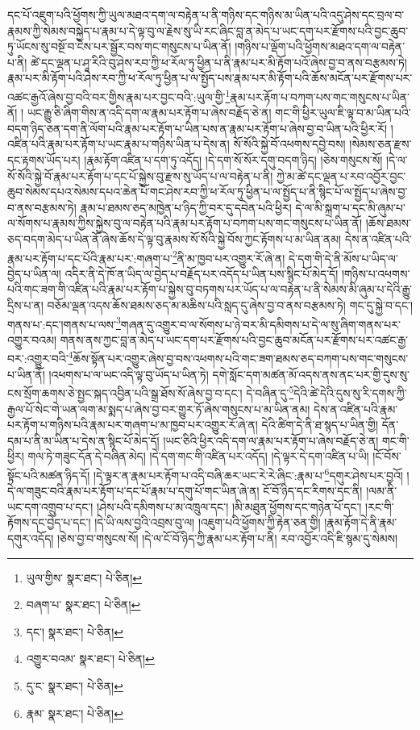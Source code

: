 དང་པོ་འཇུག་པའི་ཕྱོགས་ཀྱི་ཡུལ་མཐའ་དག་ལ་བརྟེན་པ་ནི་གཉིས་དང་གཉིས་མ་ཡིན་པའི་འདུ་ཤེས་དང་བྲལ་བ་རྣམས་ཀྱི་སེམས་བསྐྱེད་པ་རྣམ་པ་དེ་ལྟ་བུ་ལ་རྗེས་སུ་ཡི་རང་ཞིང་བླ་ན་མེད་པ་ཡང་དག་པར་རྫོགས་པའི་བྱང་ཆུབ་ཏུ་ཡོངས་སུ་བསྔོ་བ་ངེས་པར་སྦྱོར་བས་གང་གསུངས་པ་ཡིན་ནོ། །གཉིས་པ་ལྡོག་པའི་ཕྱོགས་མཐའ་དག་ལ་བརྟེན་པ་ནི། ཚེ་དང་ལྡན་པ་ཤཱ་རིའི་བུ་ཤེས་རབ་ཀྱི་ཕ་རོལ་ཏུ་ཕྱིན་པ་ནི་རྣམ་པར་མི་རྟོག་པའོ་ཞེས་བྱ་བ་ནས་བརྩམས་ཏེ། རྣམ་པར་མི་རྟོག་པའི་ཤེས་རབ་ཀྱི་ཕ་རོལ་ཏུ་ཕྱིན་པ་ལ་སྤྱོད་པས་རྣམ་པར་མི་རྟོག་པའི་ཆོས་མངོན་པར་རྫོགས་པར་འཚང་རྒྱའོ་ཞེས་བྱ་བའི་བར་གྱིས་རྣམ་པར་བྱང་བའི་:ཡུལ་གྱི་\footnote{ཡུལ་གྱིས་  སྣར་ཐང་།  པེ་ཅིན། }རྣམ་པར་རྟོག་པ་བཀག་པས་གང་གསུངས་པ་ཡིན་ནོ། །
ཡང་རྒྱུ་ཅི་ཞིག་གིས་ན་འདི་དག་ལ་རྣམ་པར་རྟོག་པ་ཞེས་བརྗོད་ཅེ་ན། གང་གི་ཕྱིར་ཡུལ་ཇི་ལྟ་བ་མ་ཡིན་པའི་བདག་ཉིད་ཅན་དག་ནི་ལོག་པའི་རྣམ་པར་རྟོག་པ་ཡིན་པས་ན་རྣམ་པར་རྟོག་པ་ཞེས་བྱ་བ་ཡིན་པའི་ཕྱིར་རོ། །འཛིན་པའི་རྣམ་པར་རྟོག་པ་ཡང་རྣམ་པ་གཉིས་ཡིན་པ་དེས་ན། སོ་སོའི་སྐྱེ་བོ་འཕགས་དབྱེ་བས། །སེམས་ཅན་རྫས་དང་རྟགས་ཡོད་པར། །རྣམ་རྟོག་འཛིན་པ་དག་ཏུ་འདོད། །དེ་དག་སོ་སོར་དགུ་བདག་ཉིད། །ཅེས་གསུངས་སོ། །དེ་ལ་སོ་སོའི་སྐྱེ་བོ་རྣམ་པར་རྟོག་པ་དང་པོ་སྐྱེས་བུ་རྫས་སུ་ཡོད་པ་ལ་བརྟེན་པ་ནི། ཀྱེ་མ་ཚེ་དང་ལྡན་པ་རབ་འབྱོར་བྱང་ཆུབ་སེམས་དཔའ་སེམས་དཔའ་ཆེན་པོ་གང་ཤེས་རབ་ཀྱི་ཕ་རོལ་ཏུ་ཕྱིན་པ་ལ་སྤྱོད་པ་ནི་སྙིང་པོ་ལ་སྤྱོད་པ་ཞེས་བྱ་བ་ནས་བརྩམས་ཏེ། རྣམ་པ་ཐམས་ཅད་མཁྱེན་པ་ཉིད་ཀྱི་བར་དུ་དབེན་པའི་ཕྱིར། དེ་ལ་མི་སྐྲག་པ་དང་མི་ཞུམ་པ་ལ་སོགས་པ་རྣམས་ཀྱིས་སྐྱེས་བུ་ལ་བརྟེན་པའི་རྣམ་པར་རྟོག་པ་བཀག་པས་གང་གསུངས་པ་ཡིན་ནོ། །ཆོས་ཐམས་ཅད་བདག་མེད་པ་ཡིན་ནོ་ཞེས་ཆོས་དེ་ལྟ་བུ་རྣམས་སོ་སོའི་སྐྱེ་བོས་ཀྱང་རྟོགས་པ་མ་ཡིན་ནམ། དེས་ན་འཛིན་པའི་རྣམ་པར་རྟོག་པ་དང་པོའི་རྣམ་པར་:གཞག་པ་\footnote{བཞག་པ་  སྣར་ཐང་།  པེ་ཅིན། }ནི་མ་ཁྱབ་པར་འགྱུར་རོ་ཞེ་ན། དེ་དག་གི་དེ་ནི་མོས་པ་ཡིད་ལ་བྱེད་པ་ཡིན་ལ། འདིར་ནི་དེ་ཁོ་ན་ཡིད་ལ་བྱེད་པ་བརྗོད་པར་འདོད་པ་ཡིན་པས་སྙིང་པོ་མེད་དོ། །གཉིས་པ་འཕགས་པའི་གང་ཟག་གི་འཛིན་པའི་རྣམ་པར་རྟོག་པ་སྐྱེས་བུ་བཏགས་པར་ཡོད་པ་ལ་བརྟེན་པ་ནི་སེམས་མི་ཞུམ་པ་དེའི་རྒྱུ་དྲིས་པ་ན། བཅོམ་ལྡན་འདས་ཆོས་ཐམས་ཅད་མ་མཆིས་པའི་སླད་དུ་ཞེས་བྱ་བ་ནས་བརྩམས་ཏེ། གང་དུ་སྐྱེ་བ་དང་། གནས་པ་:དང་།གནས་པ་ལས་\footnote{དང་།  སྣར་ཐང་།  པེ་ཅིན། }གཞན་དུ་འགྱུར་བ་ལ་སོགས་པ་ཉེ་བར་མི་དམིགས་པ་དེ་ལ་སུ་ཞིག་གནས་པར་འགྱུར་བའམ། གནས་ནས་ཀྱང་བླ་ན་མེད་པ་ཡང་དག་པར་རྫོགས་པའི་བྱང་ཆུབ་མངོན་པར་རྫོགས་པར་འཚང་རྒྱ་བར་:འགྱུར་བའི་\footnote{འགྱུར་བའམ་  སྣར་ཐང་།  པེ་ཅིན། }ཆོས་སྟོན་པར་འགྱུར་ཞེས་བྱ་བས་འཕགས་པའི་གང་ཟག་ཐམས་ཅད་བཀག་པས་གང་གསུངས་པ་ཡིན་ནོ། །འཕགས་པ་ལ་ཡང་འདི་ལྟ་བུ་ཡོད་པ་ཡིན་ཏེ། དགེ་སློང་དག་མཚན་མོ་འདས་ནས་ནང་པར་གྱི་དུས་སུ་ངས་སྲོག་ཆགས་ཅེ་སྤྱང་སྐད་འབྱིན་པའི་སྒྲ་ཐོས་སོ་ཞེས་བྱ་བ་དང་། དེ་བཞིན་དུ་\footnote{དུ་ང་  སྣར་ཐང་།  པེ་ཅིན། }དེའི་ཚེ་དེའི་དུས་སུ་རི་དགས་ཀྱི་རྒྱལ་པོ་སེང་གེ་ཡན་ལག་མ་སྨད་པ་ཞེས་བྱ་བར་གྱུར་ཏོ་ཞེས་གསུངས་པ་མ་ཡིན་ནམ། དེས་ན་འཛིན་པའི་རྣམ་པར་རྟོག་པ་གཉིས་པའི་རྣམ་པར་གཞག་པ་མ་ཁྱབ་པར་འགྱུར་རོ་ཞེ་ན། དེའི་ཚིག་དེ་ནི་ཐ་སྙད་པ་ཡིན་གྱི། དོན་དམ་པ་ནི་མ་ཡིན་པ་དེས་ན་སྙིང་པོ་མེད་དོ། །ཡང་ཅིའི་ཕྱིར་འདི་དག་ལ་རྣམ་པར་རྟོག་པ་ཞེས་བརྗོད་ཅེ་ན། གང་གི་ཕྱིར། གལ་ཏེ་གཟུང་དོན་དེ་བཞིན་མེད། །དེ་དག་གང་གི་འཛིན་པར་འདོད། །དེ་ལྟར་དེ་དག་འཛིན་པ་ཡི། །ངོ་བོས་སྟོང་པའི་མཚན་ཉིད་དོ། །དེ་ལྟར་ན་རྣམ་པར་རྟོག་པ་འདི་བཞི་ཆར་ཡང་རེ་རེ་ཞིང་:རྣམ་པ་\footnote{རྣམ་  སྣར་ཐང་།  པེ་ཅིན། }དགུར་ཤེས་པར་བྱའོ། །དེ་ལ་གཟུང་བའི་རྣམ་པར་རྟོག་པ་དང་པོ་རྣམ་པ་དགུ་པོ་གང་ཡིན་ཞེ་ན། ངོ་བོ་ཉིད་དང་རིགས་དང་ནི། །ལམ་ནི་ཡང་དག་འགྲུབ་པ་དང་། །ཤེས་པའི་དམིགས་པ་མ་འཁྲུལ་དང་། །མི་མཐུན་ཕྱོགས་དང་གཉེན་པོ་དང་། །རང་གི་རྟོགས་དང་བྱེད་པ་དང་། །དེ་ཡི་ལས་བྱའི་འབྲས་བུ་ལ། །འཇུག་པའི་ཕྱོགས་ཀྱི་རྟེན་ཅན་གྱི། །རྣམ་རྟོག་དེ་ནི་རྣམ་དགུར་འདོད། །ཅེས་བྱ་བ་གསུངས་སོ། །དེ་ལ་ངོ་བོ་ཉིད་ཀྱི་རྣམ་པར་རྟོག་པ་ནི། རབ་འབྱོར་འདི་ཇི་སྙམ་དུ་སེམས། 